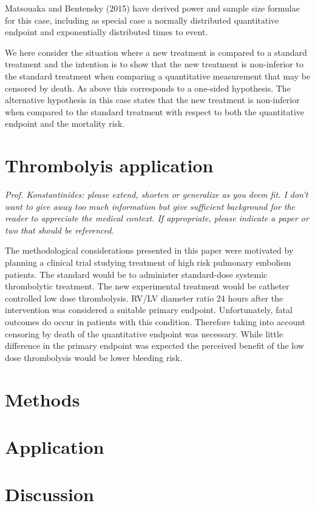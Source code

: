 \documentclass[bimj,fleqn]{w-art}\usepackage[]{graphicx}\usepackage[]{color}
\theoremstyle{plain}
\theoremstyle{definition}
\begin{document}
  Matsouaka and Bentensky (2015) have derived power and sample size formulae for
  this case, including as special case a normally distributed quantitative
  endpoint and exponentially distributed times to event.

  We here consider the situation where a new treatment is compared to a standard
  treatment and the intention is to show that the new treatment is non-inferior
  to the standard treatment when comparing a quantitative measurement that may
  be censored by death. As above this corresponds to a one-sided hypothesis.
  The alternative hypothesis in this case states that the new treatment is
  non-inferior when compared to the standard treatment with respect to both the
  quantitative endpoint and the mortality risk.

  \section{Thrombolyis application}
  \textit{Prof. Konstantinides: please extend, shorten or generalize as you deem
  fit. I don't want to give away too much information but give sufficient
  background for the reader to appreciate the medical context. If appropriate,
  please indicate a paper or two that should be referenced.}

  The methodological considerations presented in this paper were motivated by
  planning a clinical trial studying treatment of high risk pulmonary embolism
  patients. The standard would be to administer standard-dose systemic
  thrombolytic treatment. The new experimental treatment would be catheter
  controlled low dose thrombolysis. RV/LV diameter ratio 24 hours after the
  intervention was considered a suitable primary endpoint. Unfortunately, fatal
  outcomes do occur in patients with this condition. Therefore taking into
  account censoring by death of the quantitative endpoint was necessary. While
  little difference in the primary endpoint was expected the perceived benefit
  of the low dose thrombolysis would be lower bleeding risk.

  \section{Methods}

  \section{Application}

  \section{Discussion}
\end{document}
